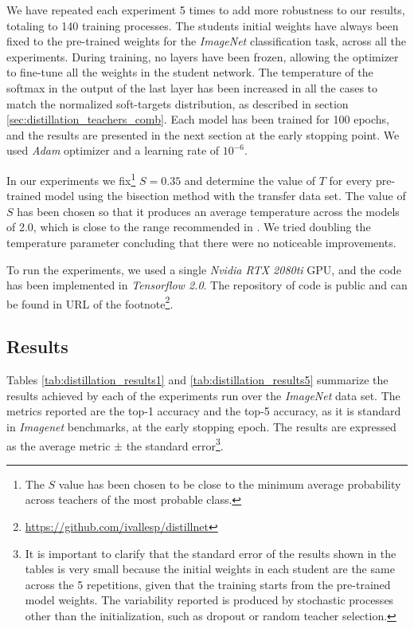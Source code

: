 We have repeated each experiment 5 times to add more robustness to our results, totaling to 140 training processes. The students initial weights have always been fixed to the pre-trained weights for the \textit{ImageNet} classification task, across all the experiments. During training, no layers have been frozen, allowing the optimizer to fine-tune all the weights in the student network. The temperature of the softmax in the output of the last layer has been increased in all the cases to match the normalized soft-targets distribution, as described in section \ref{sec:distillation_teachers_comb}.  Each model has been trained for 100 epochs, and the results are presented in the next section at the early stopping point. We used \textit{Adam} optimizer \cite{kingma14} and a learning rate of $10^{-6}$.

In our experiments we fix\footnote{The $S$ value has been chosen to be close to the minimum average probability across teachers of the most probable class.} $S=0.35$ and determine the value of $T$ for every pre-trained model using the bisection method with the transfer data set. The value of $S$ has been chosen so that it produces an average temperature across the models of 2.0, which is close to the range recommended in \cite{hinton2015}. We tried doubling the temperature parameter concluding that there were no noticeable improvements.

To run the experiments, we used a single \textit{Nvidia RTX 2080ti} GPU, and the code has been implemented in \textit{Tensorflow 2.0}. The repository of code is public and can be found in URL of the footnote\footnote{\url{https://github.com/ivallesp/distillnet}}.

\subsection{Results}  \label{sec:distillation_results}
Tables \ref{tab:distillation_results1} and \ref{tab:distillation_results5} summarize the results achieved by each of the experiments run over the \textit{ImageNet} data set. The metrics reported are the top-1 accuracy and the top-5 accuracy, as it is standard in \textit{Imagenet} benchmarks, at the early stopping epoch. The results are expressed as the average metric $\pm$ the standard error\footnote{It is important to clarify that the standard error of the results shown in the tables is very small because the initial weights in each student are the same across the 5 repetitions, given that the training starts from the pre-trained model weights. The variability reported is produced by stochastic processes other than the initialization, such as dropout or random teacher selection.}.

